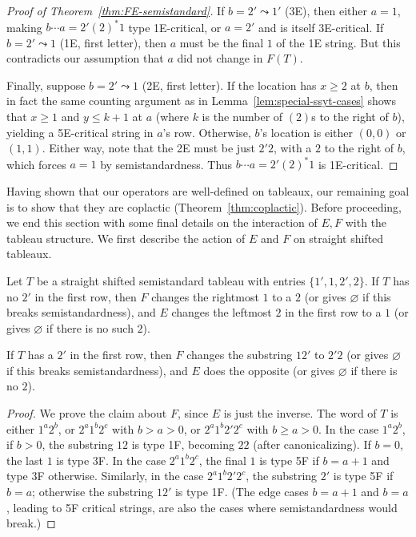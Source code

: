 \documentclass[ALCO,ThmDefs,Unicode,epreuves]{cedram}
\begin{document}
\begin{proof}[Proof of Theorem~\ref{thm:FE-semistandard}]
If $b = 2' \leadsto 1'$ (3E), then either $a=1$, making $b \cdots a = 2' (2)^*1$ type 1E-critical, or $a=2'$ and is itself 3E-critical. If $b = 2' \leadsto 1$ (1E, first letter), then $a$ must be the final $1$ of the 1E string. But this contradicts our assumption that $a$ did not change in $F(T)$.

Finally, suppose $b = 2' \leadsto 1$ (2E, first letter). If the location has $x \geq 2$ at $b$, then in fact the same counting argument as in Lemma~\ref{lem:special-ssyt-cases} 
shows that $x \geq 1$ and $y \leq k+1$ at $a$ (where $k$ is the number of $(2)$s to the right of $b$), yielding a 5E-critical string in $a$'s row. Otherwise, $b$'s location is either $(0,0)$ or $(1,1)$. Either way, note that the 2E must be just $2'2$, with a $2$ to the right of $b$, which forces $a=1$ by semistandardness. Thus $b\cdots a = 2'(2)^*1$ is 1E-critical.
\end{proof}

Having shown that our operators are well-defined on tableaux, our remaining goal is to show that they are coplactic (Theorem~\ref{thm:coplactic}). Before proceeding, we end this section with some final details on the interaction of $E,F$ with the tableau structure. We first describe the action of $E$ and $F$ on straight shifted tableaux.

\begin{prop} \label{prop:rect-unprimed-action} Let $T$ be a straight shifted semistandard tableau with entries $\{1',1,2',2\}$. If $T$ has no $2'$ in the first row, then $F$ changes the rightmost $1$ to a $2$ \textup{(}or gives $\varnothing$ if this breaks semistandardness\textup{)}, and $E$ changes the leftmost $2$ in the first row to a $1$ \textup{(}or gives $\varnothing$ if there is no such $2$\textup{)}.

If $T$ has a $2'$ in the first row, then $F$ changes the substring $12'$ to $2'2$ \textup{(}or gives $\varnothing$ if this breaks semistandardness\textup{)}, and $E$ does the opposite \textup{(}or gives $\varnothing$ if there is no $2$\textup{)}.
\end{prop}

\begin{proof}
We prove the claim about $F$, since $E$ is just the inverse. The word of $T$ is either $1^a2^b$, or $2^a1^b2^c$ with $b>a>0$, or $2^a1^b2'2^c$ with $b \geq a > 0$. In the case $1^a2^b$, if $b>0$, the substring $12$ is type 1F, becoming $22$ (after canonicalizing). If $b=0$, the last $1$ is type 3F. In the case $2^a1^b2^c$, the final $1$ is type 5F if $b=a+1$ and type 3F otherwise. Similarly, in the case $2^a1^b2'2^c$, the substring $2'$ is type 5F if $b=a$; otherwise the substring $12'$ is type 1F. (The edge cases $b=a+1$ and $b=a$, leading to 5F critical strings, are also the cases where semistandardness would break.)
\end{proof}
\end{document}
